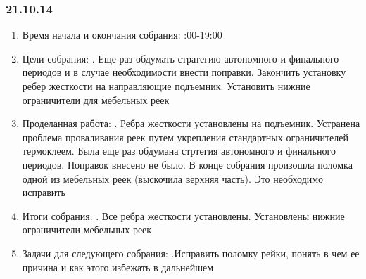 \documentclass[12pt]{article}
\begin{document}
	       \subsubsection{21.10.14}
	       \begin{enumerate}
	       	\item Время начала и окончания собрания:
	       	:00-19:00
	       	\item Цели собрания:
	       	. Еще раз обдумать стратегию автономного и финального периодов и в случае необходимости внести поправки. Закончить установку ребер жесткости на направляющие подъемник. Установить нижние ограничители для мебельных реек\newline
	       	\item Проделанная работа:
	       	. Ребра жесткости установлены на подъемник. Устранена проблема проваливания реек путем укрепления стандартных ограничителей термоклеем. Была еще раз обдумана стртегия автономного и финального периодов. Поправок внесено не было. В конце собрания произошла поломка одной из мебельных реек (выскочила верхняя часть). Это необходимо исправить
	       	\item Итоги собрания:
	       	. Все ребра жесткости установлены. Установлены нижние ограничители мебельных реек
	       	\item Задачи для следующего собрания:
	       	.Исправить поломку рейки, понять в чем ее причина и как этого избежать в дальнейшем
	       \end{enumerate} 
	       \newpage
\end{document}
